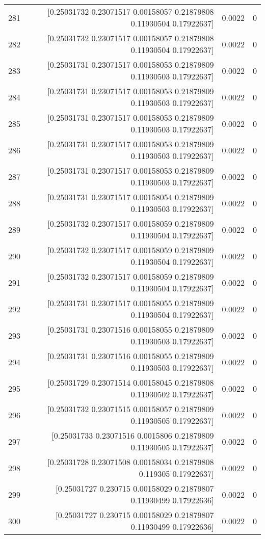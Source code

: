 \begin{longtable}{lrrr}
281 & [0.25031732 0.23071517 0.00158057 0.21879808 0.11930504 0.17922637] & 0.0022 & 0 \\
282 & [0.25031732 0.23071517 0.00158057 0.21879808 0.11930504 0.17922637] & 0.0022 & 0 \\
283 & [0.25031731 0.23071517 0.00158053 0.21879809 0.11930503 0.17922637] & 0.0022 & 0 \\
284 & [0.25031731 0.23071517 0.00158053 0.21879809 0.11930503 0.17922637] & 0.0022 & 0 \\
285 & [0.25031731 0.23071517 0.00158053 0.21879809 0.11930503 0.17922637] & 0.0022 & 0 \\
286 & [0.25031731 0.23071517 0.00158053 0.21879809 0.11930503 0.17922637] & 0.0022 & 0 \\
287 & [0.25031731 0.23071517 0.00158053 0.21879809 0.11930503 0.17922637] & 0.0022 & 0 \\
288 & [0.25031731 0.23071517 0.00158054 0.21879809 0.11930503 0.17922637] & 0.0022 & 0 \\
289 & [0.25031732 0.23071517 0.00158059 0.21879809 0.11930504 0.17922637] & 0.0022 & 0 \\
290 & [0.25031732 0.23071517 0.00158059 0.21879809 0.11930504 0.17922637] & 0.0022 & 0 \\
291 & [0.25031732 0.23071517 0.00158059 0.21879809 0.11930504 0.17922637] & 0.0022 & 0 \\
292 & [0.25031731 0.23071517 0.00158055 0.21879809 0.11930504 0.17922637] & 0.0022 & 0 \\
293 & [0.25031731 0.23071516 0.00158055 0.21879809 0.11930503 0.17922637] & 0.0022 & 0 \\
294 & [0.25031731 0.23071516 0.00158055 0.21879809 0.11930503 0.17922637] & 0.0022 & 0 \\
295 & [0.25031729 0.23071514 0.00158045 0.21879808 0.11930502 0.17922637] & 0.0022 & 0 \\
296 & [0.25031732 0.23071515 0.00158057 0.21879809 0.11930505 0.17922637] & 0.0022 & 0 \\
297 & [0.25031733 0.23071516 0.0015806  0.21879809 0.11930505 0.17922637] & 0.0022 & 0 \\
298 & [0.25031728 0.23071508 0.00158034 0.21879808 0.119305   0.17922637] & 0.0022 & 0 \\
299 & [0.25031727 0.230715   0.00158029 0.21879807 0.11930499 0.17922636] & 0.0022 & 0 \\
300 & [0.25031727 0.230715   0.00158029 0.21879807 0.11930499 0.17922636] & 0.0022 & 0 \\

\end{longtable}
